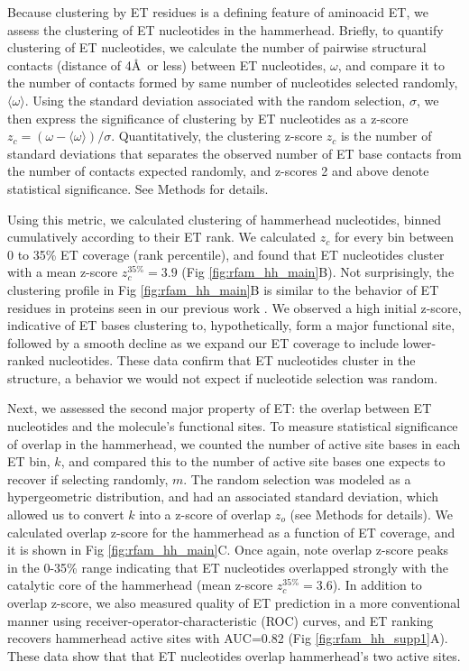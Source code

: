 \documentclass[12pt,a4paper]{report}
\begin{document}
Because clustering by ET residues is a defining feature of aminoacid ET, we assess the clustering of ET nucleotides in the hammerhead. Briefly, to quantify clustering of ET nucleotides, we calculate the number of pairwise structural contacts (distance of 4\AA\, or less) between ET nucleotides, $\omega$, and compare it to the number of contacts formed by same number of nucleotides selected randomly, $\langle\omega\rangle$. Using the standard deviation associated with the random selection, $\sigma$, we then express the significance of clustering by ET nucleotides as a z-score $z_c= (\omega - \langle\omega\rangle)/\sigma$. Quantitatively, the clustering z-score $z_c$ is the number of standard deviations that separates the observed number of ET base contacts from the number of contacts expected randomly, and z-scores 2 and above denote statistical significance. See Methods for details.

Using this metric, we calculated clustering of hammerhead nucleotides, binned cumulatively according to their ET rank. We calculated $z_c$ for every bin between 0 to 35\% ET coverage (rank percentile), and found that ET nucleotides cluster with a mean z-score $z_{c}^{35\%} = 3.9$ (Fig \ref{fig:rfam_hh_main}B). Not surprisingly, the clustering profile in Fig \ref{fig:rfam_hh_main}B is similar to the behavior of ET residues in proteins seen in our previous work \cite{Mihalek2006-1}. We observed a high initial z-score, indicative of ET bases clustering to, hypothetically, form a major functional site, followed by a smooth decline as we expand our ET coverage to include lower-ranked nucleotides. These data confirm that ET nucleotides cluster in the structure, a behavior we would not expect if nucleotide selection was random.

Next, we assessed the second major property of ET: the overlap between ET nucleotides and the molecule’s functional sites. To measure statistical significance of overlap in the hammerhead, we counted the number of active site bases in each ET bin, $k$, and compared this to the number of active site bases one expects to recover if selecting randomly, $m$. The random selection was modeled as a hypergeometric distribution, and had an associated standard deviation, which allowed us to convert $k$ into a z-score of overlap $z_o$  (see Methods for details). We calculated overlap z-score for the hammerhead as a function of ET coverage, and it is shown in Fig \ref{fig:rfam_hh_main}C. Once again, note overlap z-score peaks in the 0-35\% range indicating that ET nucleotides overlapped strongly with the catalytic core of the hammerhead (mean z-score $z_{c}^{35\%} = 3.6$). In addition to overlap z-score, we also measured quality of ET prediction in a more conventional manner using receiver-operator-characteristic (ROC) curves, and ET ranking recovers hammerhead active sites with AUC=0.82 (Fig \ref{fig:rfam_hh_supp1}A). These data show that that ET nucleotides overlap hammerhead’s two active sites.
\end{document}

